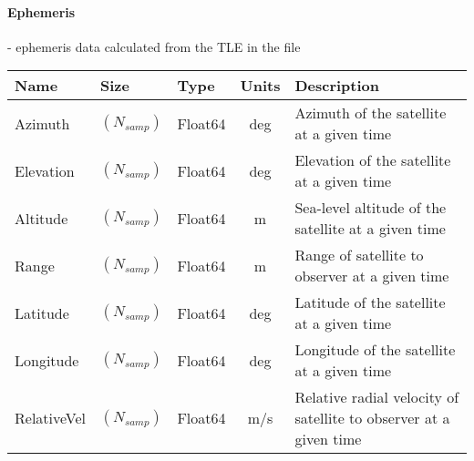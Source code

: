 \documentclass[12pt]{article}
\begin{document}
\begin{small}
\begin{scriptsize}
\begin{tabular}{|l|l|l|c|p{7cm}|}
\hline
\end{tabular}
\end{scriptsize}

\paragraph{Ephemeris}- ephemeris data calculated from the TLE in the file\\
\begin{scriptsize}
\begin{tabular}{|l|l|l|c|p{7cm}|}
\hline
\textbf{Name} & \textbf{Size} & \textbf{Type} & \textbf{Units} & \textbf{Description} \\
\hline

Azimuth & $(N_{samp})$ & Float64 & deg & Azimuth of the satellite at a given time\\
Elevation & $(N_{samp})$ & Float64 & deg & Elevation of the satellite at a given time\\
Altitude & $(N_{samp})$ & Float64 & m & Sea-level altitude of the satellite at a given time\\
Range & $(N_{samp})$ & Float64 & m & Range of satellite to observer at a given time\\
Latitude & $(N_{samp})$ & Float64 & deg & Latitude of the satellite at a given time\\
Longitude & $(N_{samp})$ & Float64 & deg & Longitude of the satellite at a given time\\
RelativeVel & $(N_{samp})$ & Float64 & m/s & Relative radial velocity of satellite to observer at a given time\\
\hline
\end{tabular}
\end{scriptsize}


\end{small}
\end{document}
